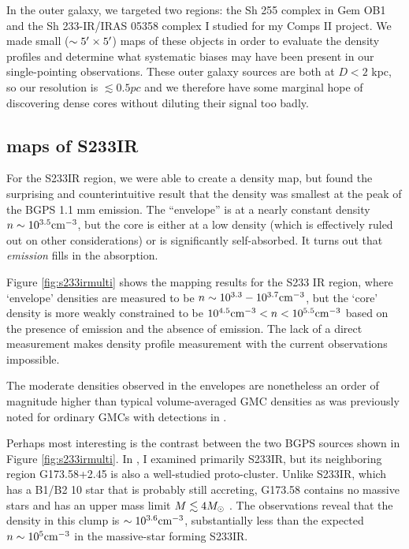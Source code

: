 In the outer galaxy, we targeted two regions: the Sh 255 complex in Gem OB1 and
the Sh 233-IR/IRAS 05358 complex I studied for my Comps II project.  We made
small ($\sim 5\mbox{$^\prime$}\times 5\mbox{$^\prime$}$) maps of these objects in order to
evaluate the density profiles and determine what systematic biases may have
been present in our single-pointing observations.  These outer galaxy sources
are both at $D<2$ kpc, so our resolution is $\lesssim 0.5 pc$ and we therefore
have some marginal hope of discovering dense cores without diluting their
signal too badly.

\subsection{\formaldehyde maps of S233IR}
For the S233IR region, we were able to create a density map, but found the
surprising and counterintuitive result that the density was smallest at the
peak of the BGPS 1.1 mm emission.  The ``envelope'' is at a nearly constant density
$n\sim10^{3.5}\textrm{cm}^{-3}$, but the core is either at a low density (which is effectively
ruled out on other considerations) or is significantly self-absorbed.  It turns out 
that \formaldehyde \twotwo \emph{emission} fills in the absorption.

Figure \ref{fig:s233irmulti} shows the mapping results for the S233 IR region, where
`envelope' densities are measured to be $n\sim10^{3.3}-10^{3.7} \textrm{cm}^{-3}$, but the `core'
density is more weakly constrained to be $10^{4.5}\textrm{cm}^{-3} < n < 10^{5.5}\textrm{cm}^{-3}$ based
on the presence of \formaldehyde \twotwo emission and the absence of \oneone emission.
The lack of a direct measurement makes density profile measurement with the current
observations impossible. 

The moderate densities observed in the envelopes are nonetheless an order of
magnitude higher than typical volume-averaged GMC densities
\citep{Roman-Duval2010} as was previously noted for ordinary GMCs with
\formaldehyde detections in \citet{Ginsburg2011}. 

Perhaps most interesting is the contrast between the two BGPS sources shown 
in Figure \ref{fig:s233irmulti}.  In \citet{Ginsburg2009}, I examined primarily
S233IR, but its neighboring region G173.58+2.45 is also a well-studied proto-cluster.
Unlike S233IR, which has a B1/B2 10 \msun star that is probably still accreting,
G173.58 contains no massive stars and has an upper mass limit $M\lesssim4 M_{\odot}$
\citep{Shepherd2002}.  The \formaldehyde observations reveal that the density in this
clump is $\sim10^{3.6} \textrm{cm}^{-3}$, substantially less than the expected $n\sim10^5 \textrm{cm}^{-3}$
in the massive-star forming S233IR.

